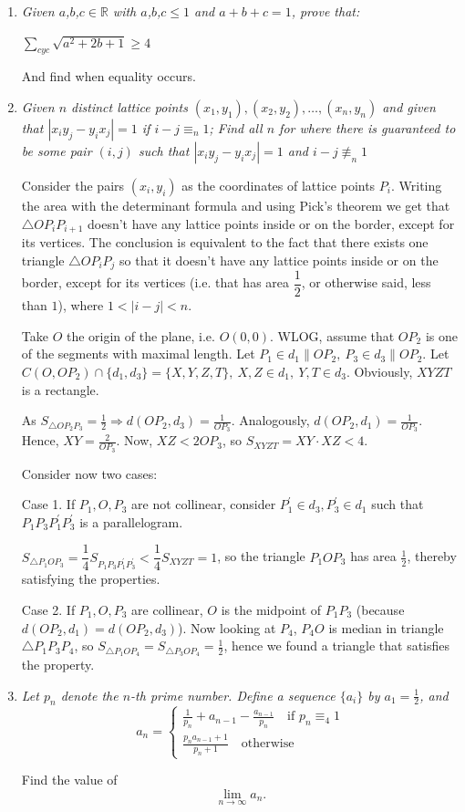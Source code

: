 \documentclass{article}
\begin{document}
\begin{enumerate}
\medskip
\item %
{\itshape 
Given $a$,$b$,$c\in\mathbb{R}$ with $a$,$b$,$c\leq 1$ and $a+b+c = 1$, prove that:
\begin{center}
   $\sum_{cyc} \sqrt{a^2+2b+1}\geq 4$ 
\end{center}
And find when equality occurs.}


\medskip
\item %
{\itshape Given $n$ distinct lattice points $(x_1,y_1),(x_2,y_2),\ldots,(x_n,y_n)$ and given that $|x_iy_{j}-y_ix_{j}| = 1$ if $i-j\equiv_n 1$;
Find all $n$ for where there is guaranteed to be some pair $(i,j)$ such that $|x_iy_{j}-y_ix_{j}| = 1$ and $i-j\not\equiv_n 1$
}

Consider the pairs $(x_i,y_i)$ as the coordinates of lattice points $P_i$. Writing the area with the determinant formula and using Pick's theorem we get that $\triangle{OP_iP_{i+1}}$ doesn't have any lattice points inside or on the border, except for its vertices.
The conclusion is equivalent to the fact that there exists one triangle $\triangle{OP_iP_j}$ so that it doesn't have any lattice points inside or on the border, except for its vertices (i.e. that has area $\dfrac{1}{2}$, or otherwise said, less than $1$), where $1<|i-j|<n$.

Take $O$ the origin of the plane, i.e. $O(0,0)$. WLOG, assume that $OP_2$ is one of the segments with maximal length. Let $P_1\in d_1\parallel OP_2,\ P_3\in d_3\parallel OP_2$. Let $C(O,OP_2)\cap \{ d_1,d_3\}=\{X,Y,Z,T\},\ X,Z\in d_1,\ Y,T\in d_3$. Obviously, $XYZT$ is a rectangle.

As $S_{\triangle{OP_2P_3}}=\frac{1}{2}\Rightarrow d(OP_2,d_3)=\frac{1}{OP_3}$. Analogously, $ d(OP_2,d_1)=\frac{1}{OP_3}$. Hence, $XY=\frac{2}{OP_3}$. Now, $XZ<2OP_3$, so $S_{XYZT}=XY\cdot XZ<4$.

Consider now two cases:

Case 1. If $P_1,O,P_3$ are not collinear, consider $P_1^\prime \in d_3, P_3^\prime \in d_1$ such that $P_1P_3P_1^\prime P_3^\prime$ is a parallelogram.

$S_{\triangle{P_1OP_3}}=\dfrac{1}{4}S_{P_1P_3P_1^\prime P_3^\prime}<\dfrac{1}{4}S_{XYZT}=1$, so the triangle $P_1OP_3$ has area $\frac{1}{2}$, thereby satisfying the properties.

Case 2. If $P_1,O,P_3$ are collinear, $O$ is the midpoint of $P_1P_3$ (because $d(OP_2,d_1)=d(OP_2,d_3)$).
Now looking at $P_4$, $P_4O$ is median in triangle $\triangle{P_1P_3P_4}$, so $S_{\triangle{P_1OP_4}}=S_{\triangle{P_3OP_4}}=\frac{1}{2}$, hence we found a triangle that satisfies the property.

\medskip
\item %
{\itshape Let $p_n$ denote the $n$-th prime number. Define a sequence $\{a_i\}$ by $a_1 = \frac{1}{2}$, and
$$
a_n = 
\begin{cases}
	\frac{1}{p_n} + a_{n - 1} - \frac{a_{n - 1}}{p_n} \quad \text{if } p_n \equiv _4 1 \\
	\frac{p_na_{n - 1} + 1}{p_n + 1} \quad \text{otherwise}
\end{cases}
$$

Find the value of 
$$\lim_{n \to \infty} a_n.$$
}

\end{enumerate}
\end{document}
